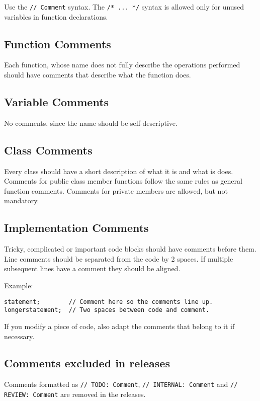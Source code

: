 \documentclass[a4paper]{article}
\newcommand{\inlinecode}[1]{\lstinline|#1|}
\begin{document}
Use the \inlinecode{// Comment} syntax. The \inlinecode{/* ... */} syntax is allowed only for unused variables in function declarations.

\subsection{Function Comments}

Each function, whose name does not fully describe the operations performed should have comments that describe what the function does.

\subsection{Variable Comments}

No comments, since the name should be self-descriptive.

\subsection{Class Comments}

Every class should have a short description of what it is and what is does.
Comments for public class member functions follow the same rules as general function comments.
Comments for private members are allowed, but not mandatory.

\subsection{Implementation Comments}

Tricky, complicated or important code blocks should have comments before them.
Line comments should be separated from the code by 2 spaces. If multiple subsequent lines have a comment they should be aligned.

Example:
\begin{lstlisting}
statement;        // Comment here so the comments line up.
longerstatement;  // Two spaces between code and comment.
\end{lstlisting}

If you modify a piece of code, also adapt the comments that belong to it if necessary.

\subsection{Comments excluded in releases}

Comments formatted as \inlinecode{// TODO: Comment}, \inlinecode{// INTERNAL: Comment} and \inlinecode{// REVIEW: Comment} are removed in the releases.
\end{document}
